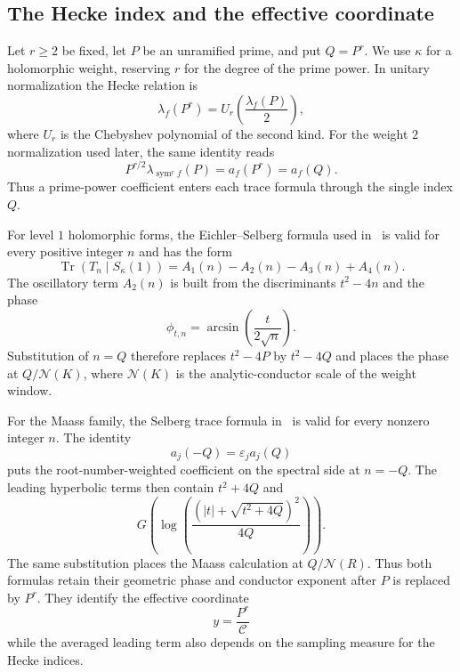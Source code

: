 \documentclass[12pt,reqno]{amsart}
\numberwithin{equation}{section}
\theoremstyle{plain}
\theoremstyle{definition}
\theoremstyle{remark}
\newcommand{\sym}{\operatorname{sym}}
\begin{document}
\subsection{The Hecke index and the effective coordinate}

Let $r\geq2$ be fixed, let $P$ be an unramified prime, and put $Q=P^r$.
We use $\kappa$ for a holomorphic weight, reserving $r$ for the degree of the prime power.
In unitary normalization the Hecke relation is
\begin{equation}
\label{eqArchimedeanHeckeIdentity}
\lambda_f(P^r)=U_r\left(\frac{\lambda_f(P)}{2}\right),
\end{equation}
where $U_r$ is the Chebyshev polynomial of the second kind.
For the weight $2$ normalization used later, the same identity reads
\begin{equation}
\label{eqPrimePowerHeckeIdentity}
P^{r/2}\lambda_{\sym^r f}(P)=a_f(P^r)=a_f(Q).
\end{equation}
Thus a prime-power coefficient enters each trace formula through the single index $Q$.

For level $1$ holomorphic forms, the Eichler--Selberg formula used in~\cite[Section~2]{BBLLD2026} is valid for every positive integer $n$ and has the form
\begin{equation}
\label{eqHolomorphicGeneralTrace}
\operatorname{Tr}(T_n\mid S_\kappa(1))
=A_1(n)-A_2(n)-A_3(n)+A_4(n).
\end{equation}
The oscillatory term $A_2(n)$ is built from the discriminants $t^2-4n$ and the phase
\begin{equation*}
\phi_{t,n}=\arcsin\left(\frac{t}{2\sqrt n}\right).
\end{equation*}
Substitution of $n=Q$ therefore replaces $t^2-4P$ by $t^2-4Q$ and places the phase at $Q/\mathcal N(K)$, where $\mathcal N(K)$ is the analytic-conductor scale of the weight window.

For the Maass family, the Selberg trace formula in~\cite[Theorem~2.1]{BLLDSHZ2024} is valid for every nonzero integer $n$.
The identity
\begin{equation*}
a_j(-Q)=\varepsilon_j a_j(Q)
\end{equation*}
puts the root-number-weighted coefficient on the spectral side at $n=-Q$.
The leading hyperbolic terms then contain $t^2+4Q$ and
\begin{equation*}
G\left(\log\left(\frac{(|t|+\sqrt{t^2+4Q})^2}{4Q}\right)\right).
\end{equation*}
The same substitution places the Maass calculation at $Q/\mathcal N(R)$.
Thus both formulas retain their geometric phase and conductor exponent after $P$ is replaced by $P^r$.
They identify the effective coordinate
\begin{equation*}
y=\frac{P^r}{\mathcal C}
\end{equation*}
while the averaged leading term also depends on the sampling measure for the Hecke indices.
\end{document}
